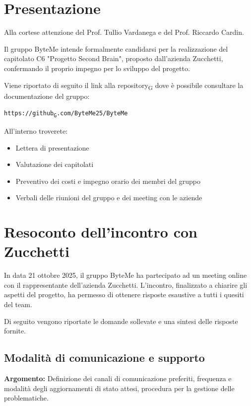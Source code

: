 \documentclass[11pt,a4paper]{article}
\newcommand{\gls}[1]{#1\textsubscript{G}}
\begin{document}
\newpage

\tableofcontents
\thispagestyle{empty}
\newpage

\setcounter{page}{1}

\section{Presentazione}
Alla cortese attenzione del Prof. Tullio Vardanega e del Prof. Riccardo Cardin.

Il gruppo ByteMe intende formalmente candidarsi per la realizzazione del capitolato C6 "Progetto Second Brain", proposto dall'azienda Zucchetti, confermando il proprio impegno per lo sviluppo del progetto.

Viene riportato di seguito il link alla \gls{repository} dove è possibile consultare la documentazione del gruppo:
\begin{center}
\texttt{https://\gls{github}.com/ByteMe25/ByteMe}
\end{center}

\noindent All'interno troverete:
\begin{itemize}
    \item Lettera di presentazione
    \item Valutazione dei capitolati
    \item Preventivo dei costi e impegno orario dei membri del gruppo
    \item Verbali delle riunioni del gruppo e dei meeting con le aziende
\end{itemize}

\newpage
\section{Resoconto dell'incontro con Zucchetti}
In data 21 ottobre 2025, il gruppo ByteMe ha partecipato ad un meeting online con il rappresentante dell'azienda Zucchetti. L'incontro, finalizzato a chiarire gli aspetti del progetto, ha permesso di ottenere risposte esaustive a tutti i quesiti del team.

Di seguito vengono riportate le domande sollevate e una sintesi delle risposte fornite.

\subsection{Modalità di comunicazione e supporto}
\textbf{Argomento:} Definizione dei canali di comunicazione preferiti, frequenza e modalità degli aggiornamenti di stato attesi, procedura per la gestione delle problematiche.
\end{document}
